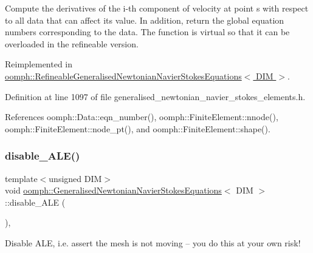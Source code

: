 Compute the derivatives of the i-\/th component of velocity at point s with respect to all data that can affect its value. In addition, return the global equation numbers corresponding to the data. The function is virtual so that it can be overloaded in the refineable version. 



Reimplemented in \hyperlink{classoomph_1_1RefineableGeneralisedNewtonianNavierStokesEquations_a00a1486786f3b1782fd7fb19cddf5cf4}{oomph\+::\+Refineable\+Generalised\+Newtonian\+Navier\+Stokes\+Equations$<$ D\+I\+M $>$}.



Definition at line 1097 of file generalised\+\_\+newtonian\+\_\+navier\+\_\+stokes\+\_\+elements.\+h.



References oomph\+::\+Data\+::eqn\+\_\+number(), oomph\+::\+Finite\+Element\+::nnode(), oomph\+::\+Finite\+Element\+::node\+\_\+pt(), and oomph\+::\+Finite\+Element\+::shape().

\mbox{\label{classoomph_1_1GeneralisedNewtonianNavierStokesEquations_af77bfb806b670ec6649f56e82169160f}} 
\subsubsection{\texorpdfstring{disable\+\_\+\+A\+L\+E()}{disable\_ALE()}}
{\footnotesize\ttfamily template$<$unsigned D\+IM$>$ \\
void \hyperlink{classoomph_1_1GeneralisedNewtonianNavierStokesEquations}{oomph\+::\+Generalised\+Newtonian\+Navier\+Stokes\+Equations}$<$ D\+IM $>$\+::disable\+\_\+\+A\+LE (\begin{DoxyParamCaption}{ }\end{DoxyParamCaption})\hspace{0.3cm}{\ttfamily [inline]}, {\ttfamily [virtual]}}



Disable A\+LE, i.\+e. assert the mesh is not moving -- you do this at your own risk! 



